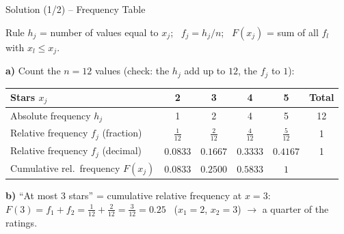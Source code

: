 \documentclass[aspectratio=169,11pt]{beamer}
\begin{document}
\begin{frame}{Solution (1/2) -- Frequency Table}
  \begin{block}{Rule}
    $h_j$ = number of values equal to $x_j$; \ $f_j = h_j / n$; \
    $F(x_j)$ = sum of all $f_l$ with $x_l \leq x_j$.
  \end{block}

  \textbf{a)} Count the $n = 12$ values (check: the $h_j$ add up to $12$, the $f_j$ to $1$):
  \begin{center}
    \renewcommand{\arraystretch}{1.2}
    \begin{tabular}{lccccc}
      \toprule
      Stars $x_j$ & 2 & 3 & 4 & 5 & Total \\
      \midrule
      Absolute frequency $h_j$ & 1 & 2 & 4 & 5 & 12 \\
      Relative frequency $f_j$ (fraction) & $\tfrac{1}{12}$ & $\tfrac{2}{12}$ & $\tfrac{4}{12}$ & $\tfrac{5}{12}$ & 1 \\
      Relative frequency $f_j$ (decimal) & $0.0833$ & $0.1667$ & $0.3333$ & $0.4167$ & 1 \\
      Cumulative rel.\ frequency $F(x_j)$ & $0.0833$ & $\mathbf{0.2500}$ & $0.5833$ & $1$ & \\
      \bottomrule
    \end{tabular}
  \end{center}

  \textbf{b)} ``At most 3 stars'' = cumulative relative frequency at $x = 3$:
  $F(3) = f_1 + f_2 = \tfrac{1}{12} + \tfrac{2}{12} = \tfrac{3}{12} = \mathbf{0.25}$ \ ($x_1 = 2$, $x_2 = 3$) $\to$ a quarter of the ratings.
\end{frame}
\end{document}
